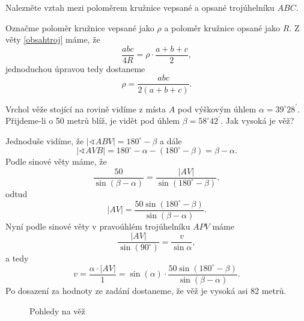 \begin{priklad}
Nalezněte vztah mezi poloměrem kružnice vepsané a opsané trojúhelníku $ABC$.
\end{priklad}

\begin{reseni}
Označme poloměr kružnice vepsané jako $\rho$ a poloměr kružnice opsané jako $R$. Z věty \ref{obsahtroj}
máme, že
$$
\frac{abc}{4R} = \rho \cdot \frac{a+b+c}{2},
$$
jednoduchou úpravou tedy dostaneme
$$
\rho = \frac{abc}{2(a+b+c)}.
$$
\end{reseni}

\begin{priklad}
Vrchol věže stojící na rovině vidíme z místa $A$ pod výškovým úhlem $\alpha= 39^\circ 28^\prime$.
Přijdeme-li o 50 metrů blíž, je vidět pod úhlem $\beta=58^\circ 42^\prime.$ Jak vysoká je věž?
\end{priklad}

\begin{reseni}
Jednoduše vidíme, že $|\sphericalangle ABV| = 180^\circ - \beta$ a dále
$$
|\sphericalangle AVB| = 180^\circ - \alpha - (180^\circ - \beta) = \beta - \alpha.
$$
Podle sinové věty máme, že
$$
\frac{50}{\sin(\beta - \alpha)} = \frac{|AV|}{\sin(180^\circ - \beta)},
$$
odtud
$$
|AV| = \frac{50 \sin(180^\circ - \beta)}{\sin(\beta - \alpha)}.
$$
Nyní podle sinové věty v pravoúhlém trojúhelníku $APV$ máme
$$
\frac{|AV|}{\sin (90^\circ)} = \frac{v}{\sin\alpha},
$$
a tedy
$$
    v=\frac{\alpha \cdot |AV|}{1} = \sin(\alpha) \cdot \frac{50 \sin(180^\circ - \beta)}{\sin(\beta - \alpha)}.
$$
Po dosazení za hodnoty ze zadání dostaneme, že věž je vysoká asi 82 metrů.
\begin{figure}
	\centering
	\caption{Pohledy na věž}
	\label{fig:vez}
\end{figure}
\end{reseni}
